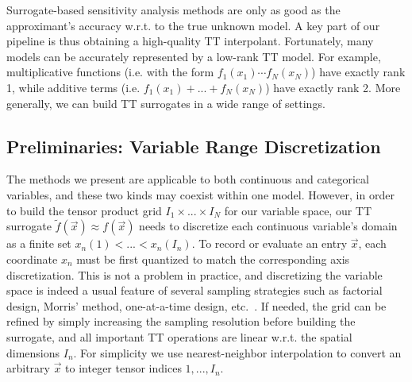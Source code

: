 \documentclass[review, twocolumn]{svjour3}          %
\begin{document}
Surrogate-based sensitivity analysis methods are only as good as the approximant's accuracy w.r.t. to the true unknown model. A key part of our pipeline is thus obtaining a high-quality TT interpolant. Fortunately, many models can be accurately represented by a low-rank TT model. For example, multiplicative functions (i.e. with the form $f_1(x_1) \cdots f_N(x_N)$) have exactly rank 1, while additive terms (i.e. $f_1(x_1) + ... + f_N(x_N)$) have exactly rank 2. More generally, we can build TT surrogates in a wide range of settings.


\subsection{Preliminaries: Variable Range Discretization} \label{sec:discretization}

The methods we present are applicable to both continuous and categorical variables, and these two kinds may coexist within one model. However, in order to build the tensor product grid $I_1 \times ... \times I_N$ for our variable space, our TT surrogate $\tilde{f}(\vec{x}) \approx f(\vec{x})$ needs to discretize each continuous variable's domain as a finite set $x_n(1) < ... < x_n(I_n)$. To record or evaluate an entry $\vec{x}$, each coordinate $x_n$ must be first quantized to match the corresponding axis discretization. This is not a problem in practice, and discretizing the variable space is indeed a usual feature of several sampling strategies such as factorial design, Morris' method, one-at-a-time design, etc.~\cite{IL:15}. If needed, the grid can be refined by simply increasing the sampling resolution before building the surrogate, and all important TT operations are linear w.r.t. the spatial dimensions $I_n$. 
For simplicity we use nearest-neighbor interpolation to convert an arbitrary $\vec{x}$ to integer tensor indices $1, ..., I_n$.
\end{document}
